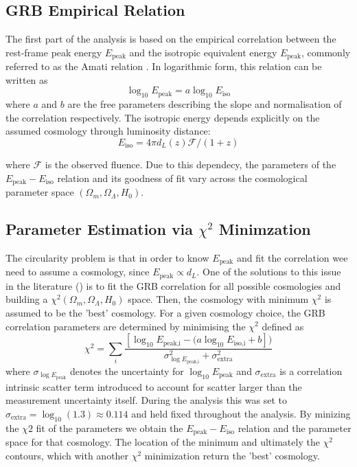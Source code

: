 \documentclass[
    aps,
    prd,
    twocolumn,
    nofootinbib,
    floatfix,
    superscriptaddress
]{revtex4-2}
\begin{document}
\subsection{GRB Empirical Relation}

The first part of the analysis is based on the empirical correlation between the rest-frame peak energy $E_\text{peak}$ and the isotropic equivalent energy $E_\text{peak}$, commonly referred to as the Amati relation \cite{ghirlanda2006}. In logarithmic form, this relation can be written as
$$
\log_{10} E_\text{peak} = a \log_{10} E_\text{iso}
$$
where $a$ and $b$ are the free parameters describing the slope and normalisation of the correlation respectively. The isotropic energy depends explicitly on the assumed cosmology through luminosity distance:
$$
E_\text{iso} = 4\pi d_L(z) \mathcal{F}/(1+z)
$$

where $\mathcal{F}$ is the observed fluence. Due to this dependecy, the parameters of the $E_\text{peak} - E_\text{iso}$ relation and its goodness of fit vary across the cosmological parameter space $(\Omega_m, \Omega_\Lambda, H_0)$.

\subsection{Parameter Estimation via $\chi^2$ Minimzation}

The circularity problem is that in order to know $E_\text{peak}$ and fit the correlation wee need to assume a cosmology, since $E_\text{peak} \propto d_L$. One of the solutions to this issue in the literature (\cite{ghirlanda2008}) is to fit the GRB correlation for all possible cosmologies and building a $\chi^2(\Omega_m, \Omega_\Lambda, H_0)$ space. Then, the cosmology with minimum $\chi^2$ is assumed to be the 'best' cosmology. For a given cosmology choice, the GRB correlation parameters are determined by minimising the $\chi^2$ defined as
$$
\chi^2 = \sum_i \frac{\left[\log_{10}E_\text{peak,i}-(a\log_{10} E_\text{iso,i}+b\right])}{\sigma_{\log E_\text{peak,i}}^2 + \sigma_\text{extra}^2}
$$
where $\sigma_{\log E_\text{peak}}$ denotes the uncertainty for $\log_{10} E_\text{peak}$ and $\sigma_\text{extra}$ is a correlation intrinsic scatter term introduced to account for scatter larger than the measurement uncertainty itself. During the analysis this was set to $\sigma_\text{extra} = \log_{10} (1.3) \approx 0.114$ and held fixed throughout the analysis. By minizing the $\chi2$ fit of the parameters we obtain the $E_\text{peak}-E_\text{iso}$ relation and the parameter space for that cosmology. The location of the minimum and ultimately the $\chi^2$ contours, which with another $\chi^2$ minimization return the 'best' cosmology.
\end{document}
